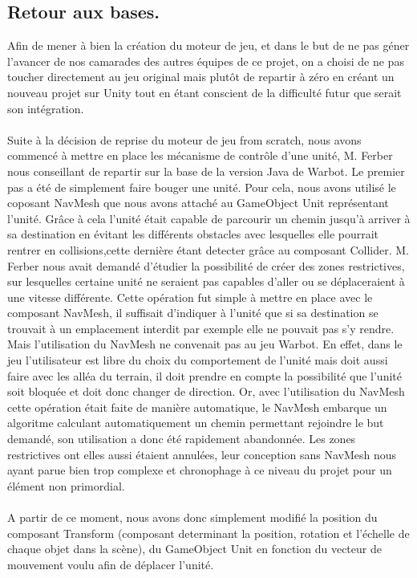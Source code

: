 \documentclass{report}
\begin{document}
\subsection{Retour aux bases.}

Afin de mener à bien la création du moteur de jeu, et dans le but de ne pas géner l'avancer de nos camarades des autres équipes de ce projet, on a choisi de ne pas toucher directement au jeu original mais plutôt de repartir à zéro en créant un nouveau projet sur Unity tout en étant conscient de la difficulté futur que serait son intégration.

\paragraph{}Suite à la décision de reprise du moteur de jeu from scratch, nous avons commencé à mettre en place les mécanisme de contrôle d'une unité, M. Ferber nous conseillant de repartir sur la base de la version Java de Warbot. Le premier pas a été de simplement faire bouger une unité. Pour cela, nous avons utilisé le coposant NavMesh que nous avons attaché au GameObject Unit représentant l'unité. Grâce à cela l'unité était capable de parcourir un chemin jusqu'à arriver à sa destination en évitant les différents obstacles avec lesquelles elle pourrait rentrer en collisions,cette dernière étant detecter grâce au composant Collider. M. Ferber nous avait demandé d'étudier la possibilité de créer des zones restrictives, sur lesquelles certaine unité ne seraient pas capables d'aller ou se déplaceraient à une vitesse différente. Cette opération fut simple à mettre en place avec le composant NavMesh, il suffisait d'indiquer à l'unité que si sa destination se trouvait à un emplacement interdit par exemple elle ne pouvait pas s'y rendre. Mais l'utilisation du NavMesh  ne convenait pas au jeu Warbot. En effet, dans le jeu l'utilisateur est libre du choix du comportement de l'unité mais doit aussi faire avec les alléa du terrain, il doit prendre en compte la possibilité que l'unité soit bloquée et doit donc changer de direction. Or, avec l'utilisation du NavMesh cette opération était faite de manière automatique, le NavMesh embarque un algoritme calculant automatiquement un chemin permettant rejoindre le but demandé, son utilisation a donc été rapidement abandonnée. Les zones restrictives ont elles aussi étaient annulées, leur conception sans NavMesh nous ayant parue bien trop complexe et chronophage à ce niveau du projet pour un élément non primordial. 
\paragraph{}A partir de ce moment, nous avons donc simplement modifié la position du composant Transform (composant determinant la position, rotation et l'échelle de chaque objet dans la scène), du GameObject Unit en fonction du vecteur de mouvement voulu afin de déplacer l'unité.
\end{document}
